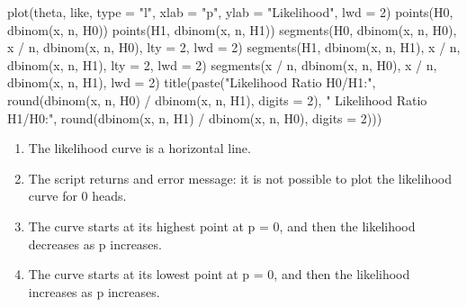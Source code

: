 \documentclass[
  oneside]{krantz}
\makeatletter
\newenvironment{Shaded}{\begin{snugshade}}{\end{snugshade}}
\newcommand{\AttributeTok}[1]{\textcolor[rgb]{0.61,0.61,0.61}{#1}}
\newcommand{\DecValTok}[1]{\textcolor[rgb]{0.06,0.06,0.06}{#1}}
\newcommand{\FunctionTok}[1]{\textcolor[rgb]{0,0,0}{#1}}
\newcommand{\NormalTok}[1]{#1}
\newcommand{\SpecialCharTok}[1]{\textcolor[rgb]{0,0,0}{#1}}
\newcommand{\StringTok}[1]{\textcolor[rgb]{0.5,0.5,0.5}{#1}}
\providecommand{\tightlist}{%
  \setlength{\itemsep}{0pt}\setlength{\parskip}{0pt}}
\newenvironment{kframe}{%
\medskip{}
\setlength{\fboxsep}{.8em}
 \def\at@end@of@kframe{}%
 \ifinner\ifhmode%
  \def\at@end@of@kframe{\end{minipage}}%
  \begin{minipage}{\columnwidth}%
 \fi\fi%
 \def\FrameCommand##1{\hskip\@totalleftmargin \hskip-\fboxsep
 \colorbox{shadecolor}{##1}\hskip-\fboxsep
     \hskip-\linewidth \hskip-\@totalleftmargin \hskip\columnwidth}%
 \MakeFramed {\advance\hsize-\width
   \@totalleftmargin\z@ \linewidth\hsize
   \@setminipage}}%
 {\par\unskip\endMakeFramed%
 \at@end@of@kframe}
\renewenvironment{Shaded}{\begin{kframe}}{\end{kframe}}
\makeatother
\begin{document}
\begin{Shaded}
\begin{Highlighting}[]
\FunctionTok{plot}\NormalTok{(theta, like, }\AttributeTok{type =} \StringTok{"l"}\NormalTok{, }\AttributeTok{xlab =} \StringTok{"p"}\NormalTok{, }\AttributeTok{ylab =} \StringTok{"Likelihood"}\NormalTok{, }\AttributeTok{lwd =} \DecValTok{2}\NormalTok{)}
\FunctionTok{points}\NormalTok{(H0, }\FunctionTok{dbinom}\NormalTok{(x, n, H0))}
\FunctionTok{points}\NormalTok{(H1, }\FunctionTok{dbinom}\NormalTok{(x, n, H1))}
\FunctionTok{segments}\NormalTok{(H0, }\FunctionTok{dbinom}\NormalTok{(x, n, H0), x }\SpecialCharTok{/}\NormalTok{ n, }\FunctionTok{dbinom}\NormalTok{(x, n, H0), }\AttributeTok{lty =} \DecValTok{2}\NormalTok{, }\AttributeTok{lwd =} \DecValTok{2}\NormalTok{)}
\FunctionTok{segments}\NormalTok{(H1, }\FunctionTok{dbinom}\NormalTok{(x, n, H1), x }\SpecialCharTok{/}\NormalTok{ n, }\FunctionTok{dbinom}\NormalTok{(x, n, H1), }\AttributeTok{lty =} \DecValTok{2}\NormalTok{, }\AttributeTok{lwd =} \DecValTok{2}\NormalTok{)}
\FunctionTok{segments}\NormalTok{(x }\SpecialCharTok{/}\NormalTok{ n, }\FunctionTok{dbinom}\NormalTok{(x, n, H0), x }\SpecialCharTok{/}\NormalTok{ n, }\FunctionTok{dbinom}\NormalTok{(x, n, H1), }\AttributeTok{lwd =} \DecValTok{2}\NormalTok{)}
\FunctionTok{title}\NormalTok{(}\FunctionTok{paste}\NormalTok{(}\StringTok{"Likelihood Ratio H0/H1:"}\NormalTok{, }\FunctionTok{round}\NormalTok{(}\FunctionTok{dbinom}\NormalTok{(x, n, H0) }\SpecialCharTok{/} \FunctionTok{dbinom}\NormalTok{(x, n, H1), }\AttributeTok{digits =} \DecValTok{2}\NormalTok{), }\StringTok{" Likelihood Ratio H1/H0:"}\NormalTok{, }\FunctionTok{round}\NormalTok{(}\FunctionTok{dbinom}\NormalTok{(x, n, H1) }\SpecialCharTok{/} \FunctionTok{dbinom}\NormalTok{(x, n, H0), }\AttributeTok{digits =} \DecValTok{2}\NormalTok{)))}
\end{Highlighting}
\end{Shaded}

\begin{enumerate}
\def\labelenumi{\Alph{enumi})}
\tightlist
\item
  The likelihood curve is a horizontal line.
\item
  The script returns and error message: it is not possible to plot the likelihood curve for 0 heads.
\item
  The curve starts at its highest point at p = 0, and then the likelihood decreases as p increases.
\item
  The curve starts at its lowest point at p = 0, and then the likelihood increases as p increases.
\end{enumerate}
\end{document}
